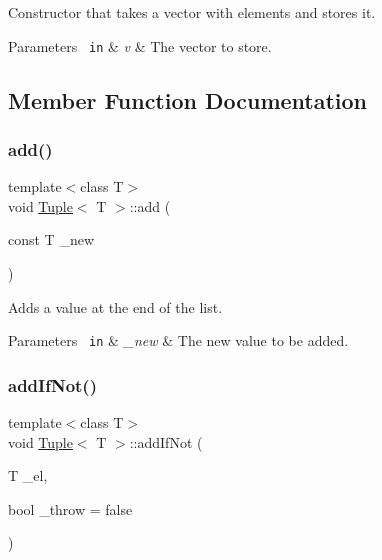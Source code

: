 Constructor that takes a vector with elements and stores it. 


\begin{DoxyParams}[1]{Parameters}
\mbox{\texttt{ in}}  & {\em v} & The vector to store. \\
\hline
\end{DoxyParams}


\subsection{Member Function Documentation}
\mbox{\label{class_tuple_a5d3ee2809d790543195a6e2075aef7d0}} 
\subsubsection{\texorpdfstring{add()}{add()}}
{\footnotesize\ttfamily template$<$class T$>$ \\
void \mbox{\hyperlink{class_tuple}{Tuple}}$<$ T $>$\+::add (\begin{DoxyParamCaption}\item[{const T}]{\+\_\+new }\end{DoxyParamCaption})\hspace{0.3cm}{\ttfamily [inline]}}



Adds a value at the end of the list. 


\begin{DoxyParams}[1]{Parameters}
\mbox{\texttt{ in}}  & {\em \+\_\+new} & The new value to be added. \\
\hline
\end{DoxyParams}
\mbox{\label{class_tuple_ac7699d6813e11c18f436098e9f76ebf0}} 
\subsubsection{\texorpdfstring{addIfNot()}{addIfNot()}}
{\footnotesize\ttfamily template$<$class T$>$ \\
void \mbox{\hyperlink{class_tuple}{Tuple}}$<$ T $>$\+::add\+If\+Not (\begin{DoxyParamCaption}\item[{T}]{\+\_\+el,  }\item[{bool}]{\+\_\+throw = {\ttfamily false} }\end{DoxyParamCaption})\hspace{0.3cm}{\ttfamily [inline]}}



